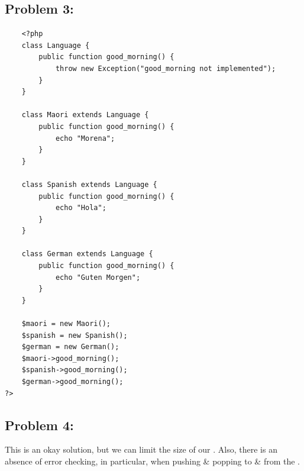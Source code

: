 \documentclass{article}
\begin{document}
\subsection*{Problem 3:} 
\begin{verbatim}
    <?php
    class Language {
        public function good_morning() {
            throw new Exception("good_morning not implemented");
        }
    }    

    class Maori extends Language {
        public function good_morning() {
            echo "Morena";
        }
    }

    class Spanish extends Language {
        public function good_morning() {
            echo "Hola";
        }
    }

    class German extends Language {
        public function good_morning() {
            echo "Guten Morgen";
        }
    }
        
    $maori = new Maori();
    $spanish = new Spanish();
    $german = new German();
    $maori->good_morning();
    $spanish->good_morning();
    $german->good_morning();
?>
\end{verbatim}

\subsection*{Problem 4:} 

This is an okay solution, but we can limit the size of our . Also, there is an absence of error checking, in particular, when pushing \& popping to \& from the .
\end{document}
